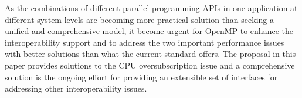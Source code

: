 


As the combinations of different parallel programming APIs in one application
at different system levels are becoming more
practical solution than seeking a unified and comprehensive model, it become urgent for OpenMP to enhance the 
interoperability support and to address the two important performance issues with better solutions 
than what the current standard offers. The proposal in this paper provides 
solutions to the CPU oversubscription issue and a comprehensive solution is the ongoing effort for 
providing an extensible set of interfaces for addressing other interoperability issues. 








